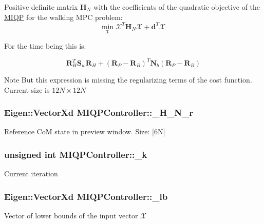 \-Positive definite matrix $\mathbf{H}_N$ with the coefficients of the quadratic objective of the \hyperlink{namespaceMIQP}{\-M\-I\-Q\-P} for the walking \-M\-P\-C problem\-: \[ \underset{\mathcal{X}}{\text{min}} \; \mathcal{X}^T \mathbf{H}_N \mathcal{X} + \mathbf{d}^T \mathcal{X} \]

\-For the time being this is\-:

\[ \mathbf{R}_H^T \mathbf{S}_w \mathbf{R}_H + (\mathbf{R}_P - \mathbf{R}_B)^T \mathbf{N}_b (\mathbf{R}_P - \mathbf{R}_B) \]

\begin{DoxyNote}{\-Note}
\-But this expression is missing the regularizing terms of the cost function. \-Current size is $12N\times12N$ 
\end{DoxyNote}
\hypertarget{classMIQPController_a03c53b7f316d43dfe1aa60eba628819c}{
\subsubsection[{\-\_\-\-H\-\_\-\-N\-\_\-r}]{\setlength{\rightskip}{0pt plus 5cm}\-Eigen\-::\-Vector\-Xd {\bf \-M\-I\-Q\-P\-Controller\-::\-\_\-\-H\-\_\-\-N\-\_\-r}}}\label{classMIQPController_a03c53b7f316d43dfe1aa60eba628819c}
\-Reference \-Co\-M state in preview window. \-Size\-: \mbox{[}6\-N\mbox{]} \hypertarget{classMIQPController_af60e2d5a786f4af4fa445dea6ba1b625}{
\subsubsection[{\-\_\-k}]{\setlength{\rightskip}{0pt plus 5cm}unsigned int {\bf \-M\-I\-Q\-P\-Controller\-::\-\_\-k}}}\label{classMIQPController_af60e2d5a786f4af4fa445dea6ba1b625}
\-Current iteration \hypertarget{classMIQPController_ad3544c00f3515146c1818440905e36cc}{
\subsubsection[{\-\_\-lb}]{\setlength{\rightskip}{0pt plus 5cm}\-Eigen\-::\-Vector\-Xd {\bf \-M\-I\-Q\-P\-Controller\-::\-\_\-lb}}}\label{classMIQPController_ad3544c00f3515146c1818440905e36cc}
\-Vector of lower bounds of the input vector $\mathcal{X}$


